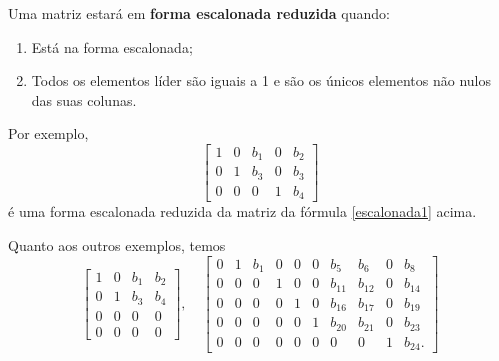 \vspace{0.2cm}

Uma matriz estará em \textbf{forma escalonada reduzida} quando:
\begin{enumerate}
  \item Está na forma escalonada;
  \item Todos os elementos líder são iguais a 1 e são os únicos elementos não nulos das suas colunas.
\end{enumerate} Por exemplo,
\begin{equation}
\left[
\begin{array}{ccccc}
   1 & 0 & b_{1} & 0 & b_{2}\\
   0 & 1 & b_{3} & 0 & b_{3}\\
   0 & 0 & 0 & 1 & b_{4}
\end{array}
\right]
\end{equation} é uma forma escalonada reduzida da matriz da fórmula \eqref{escalonada1} acima.

Quanto aos outros exemplos, temos
\begin{equation}
\left[
\begin{array}{cccc}
1 & 0 & b_1 & b_2 \\
0 & 1 & b_3 & b_4 \\
0 & 0 & 0 & 0 \\
0 & 0 & 0 & 0
\end{array}
\right], \quad
\left[
\begin{array}{cccccccccc}
0 & 1 & b_1 & 0 & 0 & 0 & b_5 & b_6 & 0 & b_8 \\
0 & 0 & 0 & 1 & 0 &0 & b_{11} & b_{12} & 0 & b_{14} \\
0 & 0 & 0 & 0 & 1 & 0 & b_{16} & b_{17} & 0 & b_{19} \\
0 & 0 & 0 & 0 & 0 & 1 & b_{20} & b_{21} & 0 & b_{23} \\
0 & 0 & 0 & 0 & 0 & 0 & 0 & 0 & 1 & b_{24}.
\end{array}
\right]
\end{equation}

